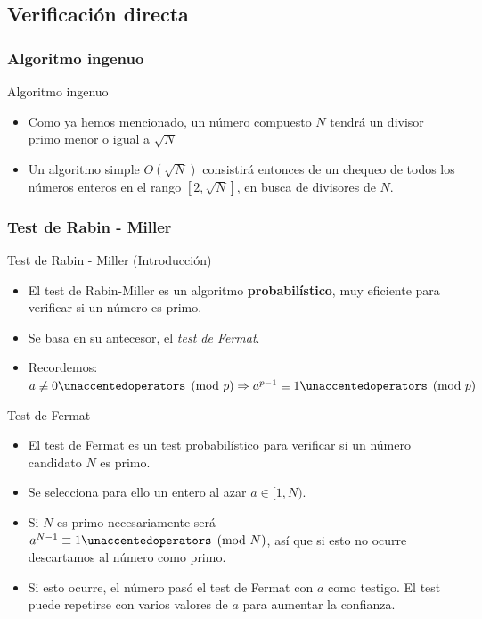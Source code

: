 \documentclass{beamer}
\begin{document}
\subsection{Verificación directa}

\subsubsection{Algoritmo ingenuo}

\begin{frame}{Algoritmo ingenuo}
  \begin{itemize}
      \item Como ya hemos mencionado, un número compuesto $N$ tendrá un divisor primo menor o igual a $\sqrt{N}$
      \item Un algoritmo simple $O(\sqrt{N})$ consistirá entonces de un chequeo de todos los números enteros en el rango $[2, \sqrt{N}]$,
             en busca de divisores de $N$.
  \end{itemize}
\end{frame}


\subsubsection{Test de Rabin - Miller}

\begin{frame}{Test de Rabin - Miller (Introducción)}
  \begin{itemize}
      \item El test de Rabin-Miller es un algoritmo \textbf{probabilístico}, muy eficiente para verificar si un número es primo.
      \item Se basa en su antecesor, el \textit{test de Fermat}.
      \item Recordemos: $a \not\equiv 0 \modulo{p} \Rightarrow a^{p-1} \equiv 1 \modulo{p}$
  \end{itemize}
\end{frame}

\begin{frame}{Test de Fermat}
  \begin{itemize}
      \item El test de Fermat es un test probabilístico para verificar si un número candidato $N$ es primo.
      \item Se selecciona para ello un entero al azar $a \in [1, N)$.
      \item Si $N$ es primo necesariamente será $a^{N-1} \equiv 1 \modulo{N}$, así que si esto no ocurre descartamos al número como primo.
      \item Si esto ocurre, el número pasó el test de Fermat con $a$ como testigo. El test puede repetirse con varios valores de $a$ para aumentar la confianza.
  \end{itemize}
\end{frame}
\end{document}
